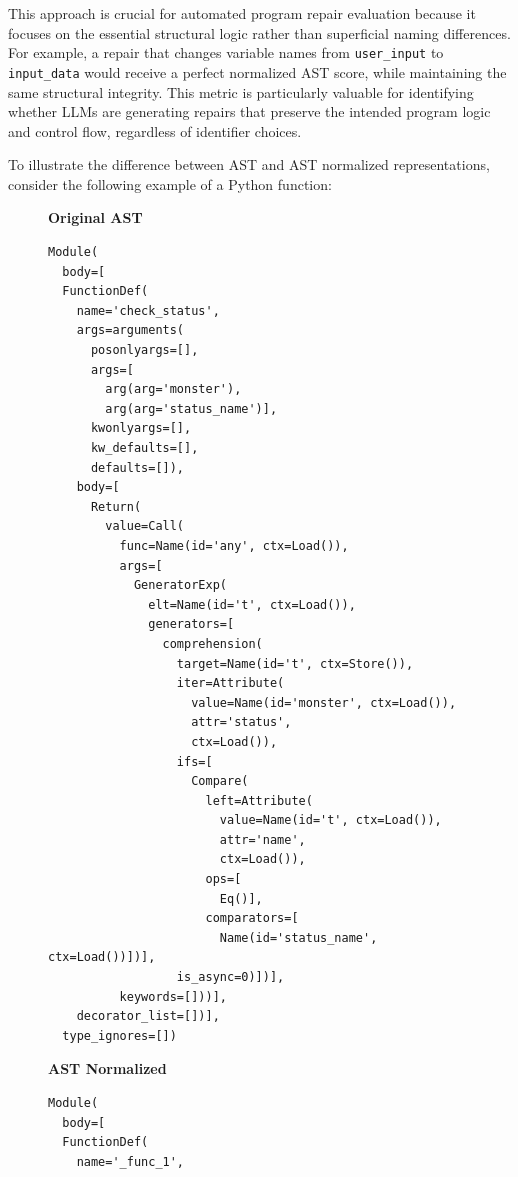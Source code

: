 This approach is crucial for automated program repair evaluation because it focuses on the essential structural logic rather than superficial naming differences. For example, a repair that changes variable names from \texttt{user\_input} to \texttt{input\_data} would receive a perfect normalized AST score, while maintaining the same structural integrity. This metric is particularly valuable for identifying whether LLMs are generating repairs that preserve the intended program logic and control flow, regardless of identifier choices.

To illustrate the difference between AST and AST normalized representations, consider the following example of a Python function:

\begin{figure}[h!]
\centering
\begin{minipage}{0.46\textwidth}
\centering
\textbf{Original AST}
\begin{lstlisting}[basicstyle=\ttfamily\tiny, frame=single, breaklines=true]
Module(
  body=[
  FunctionDef(
    name='check_status',
    args=arguments(
      posonlyargs=[],
      args=[
        arg(arg='monster'),
        arg(arg='status_name')],
      kwonlyargs=[],
      kw_defaults=[],
      defaults=[]),
    body=[
      Return(
        value=Call(
          func=Name(id='any', ctx=Load()),
          args=[
            GeneratorExp(
              elt=Name(id='t', ctx=Load()),
              generators=[
                comprehension(
                  target=Name(id='t', ctx=Store()),
                  iter=Attribute(
                    value=Name(id='monster', ctx=Load()),
                    attr='status',
                    ctx=Load()),
                  ifs=[
                    Compare(
                      left=Attribute(
                        value=Name(id='t', ctx=Load()),
                        attr='name',
                        ctx=Load()),
                      ops=[
                        Eq()],
                      comparators=[
                        Name(id='status_name', ctx=Load())])],
                  is_async=0)])],
          keywords=[]))],
    decorator_list=[])],
  type_ignores=[])
\end{lstlisting}
\end{minipage}
\hfill
\begin{minipage}{0.50\textwidth}
\centering
\textbf{AST Normalized}
\begin{lstlisting}[basicstyle=\ttfamily\tiny, frame=single, breaklines=true]
Module(
  body=[
  FunctionDef(
    name='_func_1',

\end{lstlisting}
\end{minipage}
\end{figure}
